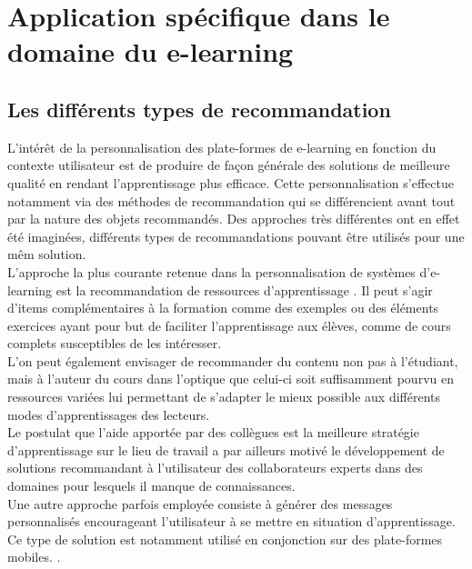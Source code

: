 \documentclass[conference]{./sty/IEEEtran}
\begin{document}
\section{Application spécifique dans le domaine du e-learning}

\subsection{Les différents types de recommandation}

L'intérêt de la personnalisation des plate-formes de e-learning en fonction du
contexte utilisateur est de produire de façon générale des solutions de
meilleure qualité en rendant l'apprentissage plus efficace. Cette
personnalisation s'effectue notamment via des méthodes de recommandation qui se
différencient avant tout par la nature des objets recommandés. Des approches
très différentes ont en effet été imaginées, différents types de
recommandations pouvant être utilisés pour une mêm solution. \\

L'approche la plus courante retenue dans la personnalisation de systèmes
d'e-learning est la recommandation de ressources d'apprentissage
\cite{DBLP:journals/tlt/VerbertMOWDBD12}. Il peut s'agir d'items
complémentaires à la formation comme des exemples ou des éléments exercices
ayant pour but de faciliter l'apprentissage aux élèves, comme de cours complets
susceptibles de les intéresser. \\

L'on peut également envisager de recommander du contenu non pas à
l'étudiant, mais à l'auteur du cours \cite{smartECourseRecommander} dans
l'optique que celui-ci soit suffisamment pourvu en ressources variées lui
permettant de s'adapter le mieux possible aux différents modes d'apprentissages
des lecteurs. \\

Le postulat que l'aide apportée par des collègues est la meilleure stratégie
d'apprentissage sur le lieu de travail a par ailleurs motivé le développement
de solutions recommandant à l'utilisateur des collaborateurs experts dans des
domaines pour lesquels il manque de
connaissances\cite{DBLP:journals/procedia/BehamKLL10}.\\

Une autre approche parfois employée consiste à générer des messages
personnalisés encourageant l'utilisateur à se mettre en situation
d'apprentissage. Ce type de solution est notamment utilisé en conjonction sur
des plate-formes mobiles. \cite{DBLP:conf/wmte/PetersenM06}. \\
\end{document}
